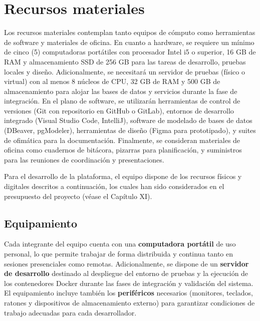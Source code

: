 \section{Recursos materiales}

Los recursos materiales contemplan tanto equipos de cómputo como herramientas de software y materiales de 
oficina. En cuanto a hardware, se requiere un mínimo de cinco (5) computadoras portátiles con procesador 
Intel i5 o superior, 16 GB de RAM y almacenamiento SSD de 256 GB para las tareas de desarrollo, pruebas 
locales y diseño. Adicionalmente, se necesitará un servidor de pruebas (físico o virtual) con al menos 8 
núcleos de CPU, 32 GB de RAM y 500 GB de almacenamiento para alojar las bases de datos y servicios durante 
la fase de integración. En el plano de software, se utilizarán herramientas de control de versiones (Git 
con repositorio en GitHub o GitLab), entornos de desarrollo integrado (Visual Studio Code, IntelliJ), software 
de modelado de bases de datos (DBeaver, pgModeler), herramientas de diseño (Figma para prototipado), y suites 
de ofimática para la documentación. Finalmente, se consideran materiales de oficina como cuadernos de bitácora, 
pizarras para planificación, y suministros para las reuniones de coordinación y presentaciones.



Para el desarrollo de la plataforma, el equipo dispone de los recursos físicos y digitales
descritos a continuación, los cuales han sido considerados en el presupuesto del proyecto
(véase el Capítulo XI).

\subsection*{Equipamiento}

Cada integrante del equipo cuenta con una \textbf{computadora portátil} de uso personal,
lo que permite trabajar de forma distribuida y continua tanto en sesiones presenciales como
remotas. Adicionalmente, se dispone de un \textbf{servidor de desarrollo} destinado al
despliegue del entorno de pruebas y la ejecución de los contenedores Docker durante las
fases de integración y validación del sistema. El equipamiento incluye también los
\textbf{periféricos} necesarios (monitores, teclados, ratones y dispositivos de
almacenamiento externo) para garantizar condiciones de trabajo adecuadas para cada
desarrollador.

